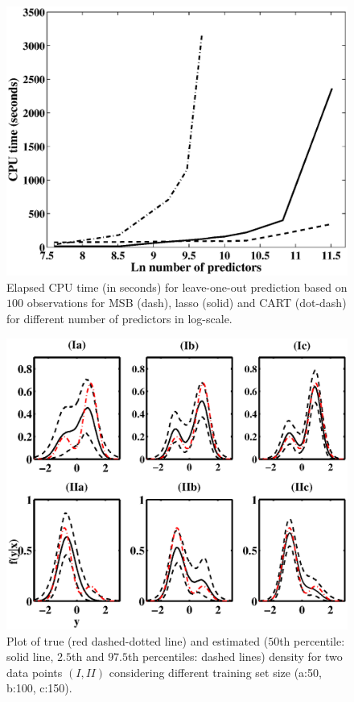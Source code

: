 \documentclass{article}
\begin{document}
\nocite{langley00}



\begin{figure}[h!]
\centering
\includegraphics[width=1.0\linewidth]{Cpu.eps}
\caption{Elapsed CPU time (in seconds) for leave-one-out prediction based on $100$ observations for MSB (dash), lasso (solid) and CART (dot-dash) for different number of predictors in log-scale.} \label{Cpu}
\end{figure}

\begin{figure}[h!]
\centering
\includegraphics[width=1.0\linewidth]{densityestimate.eps}
\caption{Plot of true (red dashed-dotted line) and estimated ($50$th percentile: solid line, $2.5$th and $97.5$th percentiles: dashed lines) density for two data points $(I, II)$ considering different training set size (a:50, b:100, c:150). } \label{plotDensity}
\end{figure}
\end{document}
